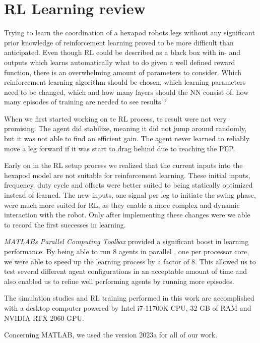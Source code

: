 \section{RL Learning review}
Trying to learn the coordination of a hexapod robots legs without any significant prior knowledge of reinforcement learning proved to be more difficult than anticipated.
Even though RL could be described as a black box with in- and outputs which learns automatically what to do given a well defined reward function, there is an overwhelming amount of parameters to consider.
Which reinforcement learning algorithm should be chosen, which learning parameters need to be changed, which and how many layers should the NN consist of, how many episodes of training are needed to see results ?


When we first started working on te RL process, te result were not very promising. The agent did stabilize, meaning it did not jump around randomly, but it was not able to find an efficient gain.
The agent never learned to reliably move a leg forward if it was start to drag behind due to reaching the PEP.

Early on in the RL setup process we realized that the current inputs into the hexapod model are not suitable for reinforcement learning.
These initial inputs, frequency, duty cycle and offsets were better suited to being statically optimized instead of learned.
The new inputs, one signal per leg to initiate the swing phase, were much more suited for RL, as they enable a more complex and dynamic interaction with the robot.
Only after implementing these changes were we able to record the first successes in learning.


\textit{MATLABs Parallel Computing Toolbox} provided a significant boost in learning performance.
By being able to run 8 agents in parallel , one per processor core, we were able to speed up the learning process by a factor of 8.
This allowed us to test several different agent configurations in an acceptable amount of time and also enabled us to refine well performing agents by running more episodes.

The simulation studies and RL training performed in this work are accomplished with a desktop computer powered by Intel i7-11700K CPU, 32 GB of RAM and NVIDIA RTX 2060 GPU.

Concerning MATLAB, we used the version 2023a for all of our work.


